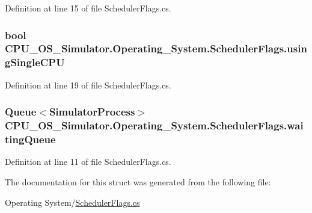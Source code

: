 Definition at line 15 of file Scheduler\+Flags.\+cs.

\hypertarget{struct_c_p_u___o_s___simulator_1_1_operating___system_1_1_scheduler_flags_a7b42d8ef49035b7d450032a1e4060fb6}{}
\subsubsection[{using\+Single\+C\+P\+U}]{\setlength{\rightskip}{0pt plus 5cm}bool C\+P\+U\+\_\+\+O\+S\+\_\+\+Simulator.\+Operating\+\_\+\+System.\+Scheduler\+Flags.\+using\+Single\+C\+P\+U}\label{struct_c_p_u___o_s___simulator_1_1_operating___system_1_1_scheduler_flags_a7b42d8ef49035b7d450032a1e4060fb6}


Definition at line 19 of file Scheduler\+Flags.\+cs.

\hypertarget{struct_c_p_u___o_s___simulator_1_1_operating___system_1_1_scheduler_flags_acd01af6379302599c522a0331a6276fc}{}
\subsubsection[{waiting\+Queue}]{\setlength{\rightskip}{0pt plus 5cm}Queue$<${\bf Simulator\+Process}$>$ C\+P\+U\+\_\+\+O\+S\+\_\+\+Simulator.\+Operating\+\_\+\+System.\+Scheduler\+Flags.\+waiting\+Queue}\label{struct_c_p_u___o_s___simulator_1_1_operating___system_1_1_scheduler_flags_acd01af6379302599c522a0331a6276fc}


Definition at line 11 of file Scheduler\+Flags.\+cs.



The documentation for this struct was generated from the following file\+:\begin{DoxyCompactItemize}
\item 
Operating System/\hyperlink{_scheduler_flags_8cs}{Scheduler\+Flags.\+cs}\end{DoxyCompactItemize}
